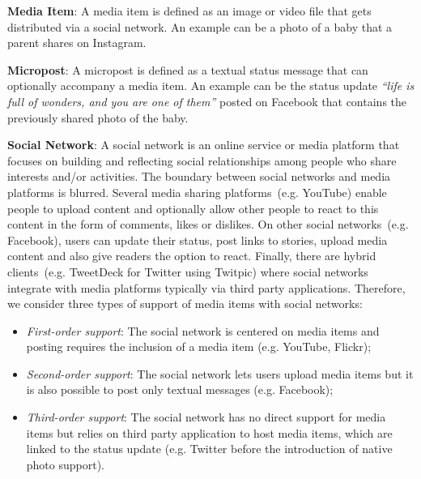 \documentclass{acm_proc_article-sp}
\let\oldemph\emph
\renewcommand{\emph}[1]{\oldemph{\fontsize{9}{9}\selectfont #1}}
\begin{document}
\textbf{Media Item}: A media item is defined as an image or video file that gets distributed via a social network. An example can be a photo of a baby that
a parent shares on Instagram.

\textbf{Micropost}: A micropost is defined as a textual status message that can optionally accompany a media item. An example can be the status update
\emph{``life is full of wonders, and you are one of them''} posted on Facebook that contains the previously shared photo of the baby.

\textbf{Social Network}: A social network is an online service or media platform that focuses on building and reflecting social relationships among
people who share interests and/or activities. The boundary between social networks and media platforms is blurred.
Several media sharing platforms~(e.g. YouTube) enable people to upload content and optionally allow other people to react
to this content in the form of comments, likes or dislikes. On other social networks~(e.g. Facebook), users can update their status,
post links to stories, upload media content and also give readers the option to react. Finally, there are hybrid clients~(e.g. TweetDeck
for Twitter using Twitpic) where social networks integrate with media platforms typically via third party applications.
Therefore, we consider three types of support of media items with social networks:
\begin{itemize}
  \item \emph{First-order support}: The social network is centered on media items and posting requires the inclusion of a media item (e.g. YouTube, Flickr);
  \item \emph{Second-order support}: The social network lets users upload media items but it is also possible to post only textual messages (e.g. Facebook);
  \item \emph{Third-order support}: The social network has no direct support for media items but relies on third party application to host media items,
which are linked to the status update (e.g. Twitter before the introduction of native photo support).
\end{itemize}
\end{document}
